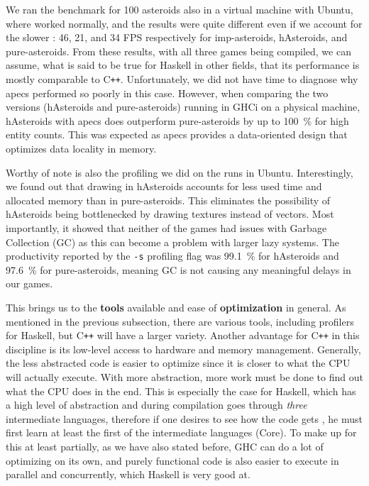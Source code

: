 \documentclass[
  digital, %
  color,   %
  table,   %
  oneside, %
  lof,     %
  lot,     %
]{fithesis3}
\newcommand{\cpp}{C\nolinebreak\texttt{+}\nolinebreak\texttt{+}}
\begin{document}
{We ran the benchmark for 100 asteroids also in a virtual machine with Ubuntu,
where  worked normally, and the results were quite different
even if we account for the slower :
46, 21, and 34 FPS respectively for imp-asteroids, hAsteroids, and pure-asteroids.
From these results, with all three games being compiled, we can assume,
what is said to be true for Haskell in other fields,
that its performance is mostly comparable to \cpp{}.
Unfortunately, we did not have time to diagnose why apecs performed so poorly in this case.
However, when comparing the two versions (hAsteroids and pure-asteroids)
running in GHCi on a physical machine,
hAsteroids with apecs does outperform pure-asteroids by up to 100~\% for high entity counts.
This was expected as apecs provides a data-oriented design that optimizes data locality in memory.

Worthy of note is also the profiling we did on the runs in Ubuntu.
Interestingly, we found out that drawing in hAsteroids accounts for less
used time and allocated memory than in pure-asteroids.\footnotemark{} This eliminates the
possibility of hAsteroids being bottlenecked by drawing textures instead of vectors.
Most importantly, it showed that neither of the games had issues with Garbage Collection (GC)
as this can become a problem with larger lazy systems.
The productivity reported by the \texttt{-s} profiling flag was 99.1~\%
for hAsteroids and 97.6~\% for pure-asteroids,
meaning GC is not causing any meaningful delays in our games.

This brings us to the \textbf{tools} available and ease of \textbf{optimization} in general.
As mentioned in the previous subsection, there are various tools, including
profilers for Haskell, but \cpp{} will have a larger variety. Another advantage
for \cpp{} in this discipline is its low-level access to hardware and memory management.
Generally, the less abstracted code is easier to optimize since it is closer to
what the CPU will actually execute. With more abstraction, more work must be
done to find out what the CPU does in the end. This is especially the case for Haskell,
which has a high level of abstraction and during compilation goes through \emph{three} intermediate
languages, therefore if one desires to see how the code gets , he must
first learn at least the first of the intermediate languages (Core).
To make up for this at least partially, as we have also stated before,
GHC can do a lot of optimizing on its own, and purely functional code is also easier
to execute in parallel and concurrently, which Haskell is very good at.



}
\end{document}
